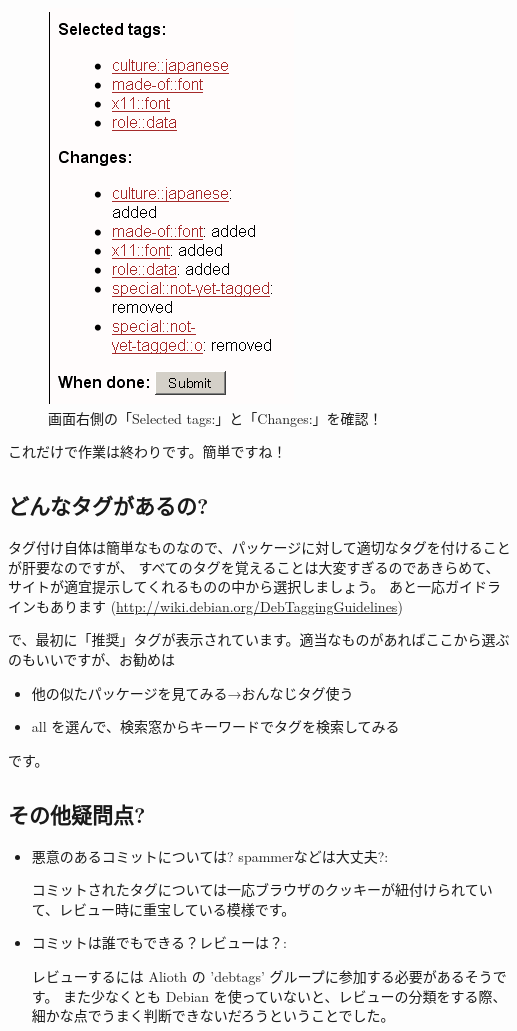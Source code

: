 \documentclass[mingoth,a4paper]{jsarticle}
\begin{document}
\begin{figure}[H]
\begin{center}
 \includegraphics[height=0.5\hsize] {image201004/gotagging03.png}
 \caption{画面右側の「Selected tags:」と「Changes:」を確認！}
\label{fig:gotagging03}
\end{center}
\end{figure}


これだけで作業は終わりです。簡単ですね！


\subsection{どんなタグがあるの?}

タグ付け自体は簡単なものなので、パッケージに対して適切なタグを付けることが肝要なのですが、
すべてのタグを覚えることは大変すぎるのであきらめて、
サイトが適宜提示してくれるものの中から選択しましょう。
あと一応ガイドラインもあります (\url{http://wiki.debian.org/DebTaggingGuidelines})

で、最初に「推奨」タグが表示されています。適当なものがあればここから選ぶのもいいですが、お勧めは
\begin{itemize}
 \item 他の似たパッケージを見てみる→おんなじタグ使う
 \item all を選んで、検索窓からキーワードでタグを検索してみる
\end{itemize}
です。


\subsection{その他疑問点?}

\begin{itemize}
 \item 悪意のあるコミットについては? spammerなどは大丈夫?:

        コミットされたタグについては一応ブラウザのクッキーが紐付けられていて、レビュー時に重宝している模様です。

 \item コミットは誰でもできる？レビューは？:
 
        レビューするには Alioth の 'debtags' グループに参加する必要があるそうです。
        また少なくとも Debian を使っていないと、レビューの分類をする際、細かな点でうまく判断できないだろうということでした。
\end{itemize}
\end{document}
